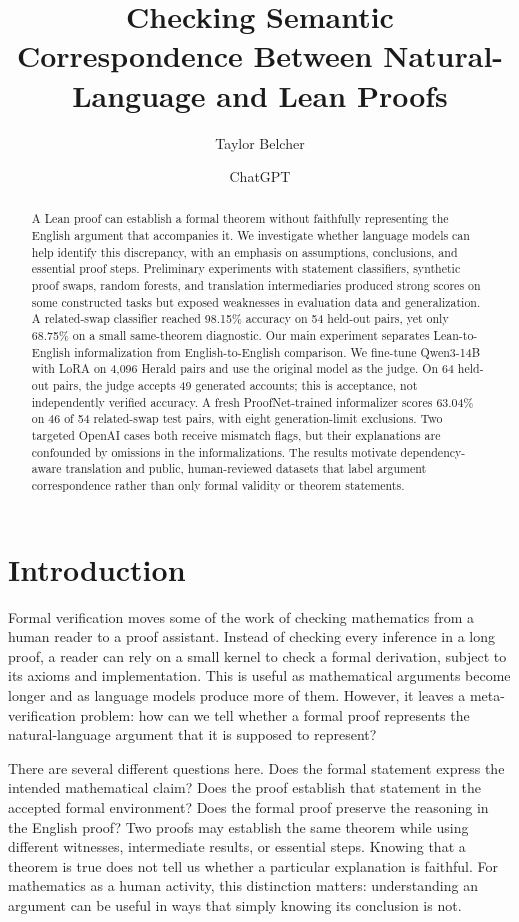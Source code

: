 \documentclass[sigconf,nonacm]{acmart}
\title{Checking Semantic Correspondence Between Natural-Language and Lean Proofs}
\author{Taylor Belcher}
\author{ChatGPT}
\begin{document}
\begin{abstract}
A Lean proof can establish a formal theorem without faithfully representing the English argument that accompanies it. We investigate whether language models can help identify this discrepancy, with an emphasis on assumptions, conclusions, and essential proof steps. Preliminary experiments with statement classifiers, synthetic proof swaps, random forests, and translation intermediaries produced strong scores on some constructed tasks but exposed weaknesses in evaluation data and generalization. A related-swap classifier reached 98.15\% accuracy on 54 held-out pairs, yet only 68.75\% on a small same-theorem diagnostic. Our main experiment separates Lean-to-English informalization from English-to-English comparison. We fine-tune Qwen3-14B with LoRA on 4,096 Herald pairs and use the original model as the judge. On 64 held-out pairs, the judge accepts 49 generated accounts; this is acceptance, not independently verified accuracy. A fresh ProofNet-trained informalizer scores 63.04\% on 46 of 54 related-swap test pairs, with eight generation-limit exclusions. Two targeted OpenAI cases both receive mismatch flags, but their explanations are confounded by omissions in the informalizations. The results motivate dependency-aware translation and public, human-reviewed datasets that label argument correspondence rather than only formal validity or theorem statements.
\end{abstract}
\maketitle

\section{Introduction}
Formal verification moves some of the work of checking mathematics from a human reader to a proof assistant. Instead of checking every inference in a long proof, a reader can rely on a small kernel to check a formal derivation, subject to its axioms and implementation. This is useful as mathematical arguments become longer and as language models produce more of them. However, it leaves a meta-verification problem: how can we tell whether a formal proof represents the natural-language argument that it is supposed to represent?

There are several different questions here. Does the formal statement express the intended mathematical claim? Does the proof establish that statement in the accepted formal environment? Does the formal proof preserve the reasoning in the English proof? Two proofs may establish the same theorem while using different witnesses, intermediate results, or essential steps. Knowing that a theorem is true does not tell us whether a particular explanation is faithful. For mathematics as a human activity, this distinction matters: understanding an argument can be useful in ways that simply knowing its conclusion is not.
\end{document}
